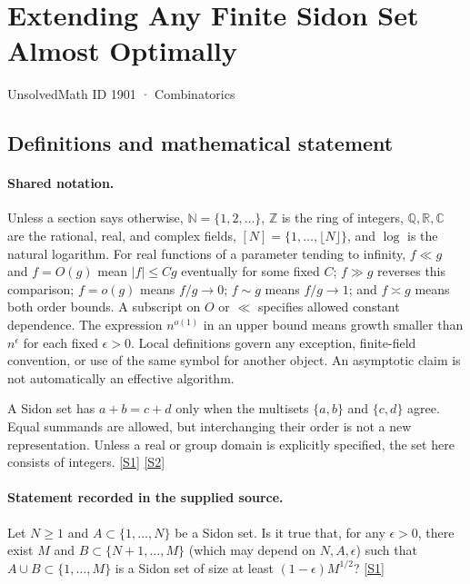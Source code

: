\documentclass[11pt,a4paper]{article}
\newcommand{\N}{\mathbb{N}}
\newcommand{\Z}{\mathbb{Z}}
\newcommand{\Q}{\mathbb{Q}}
\newcommand{\R}{\mathbb{R}}
\newcommand{\C}{\mathbb{C}}
\newcommand{\sref}[2]{\hyperlink{source:#1:#2}{[S#2]}}
\begin{document}

\setcounter{section}{1900}

\section{Extending Any Finite Sidon Set Almost Optimally}\label{1901}

{\small\sffamily UnsolvedMath ID 1901 · Combinatorics}

\subsection{Definitions and mathematical statement}

\paragraph{Shared notation.}Unless a section says otherwise, $\N=\{1,2,\ldots\}$,
$\Z$ is the ring of integers, $\Q,\R,\C$ are the rational, real, and complex
fields, $[N]=\{1,\ldots,\lfloor N\rfloor\}$, and $\log$ is the natural
logarithm. For real functions of a parameter tending to infinity,
$f\ll g$ and $f=O(g)$ mean $|f|\leq Cg$ eventually for some fixed $C$;
$f\gg g$ reverses this comparison; $f=o(g)$ means $f/g\to0$;
$f\sim g$ means $f/g\to1$; and $f\asymp g$ means both order bounds.
A subscript on $O$ or $\ll$ specifies allowed constant dependence.
The expression $n^{o(1)}$ in an upper bound means growth smaller than
$n^\epsilon$ for each fixed $\epsilon>0$. Local definitions govern any
exception, finite-field convention, or use of the same symbol for another
object. An asymptotic claim is not automatically an effective algorithm.



A Sidon set has $a+b=c+d$ only when the multisets $\{a,b\}$ and $\{c,d\}$ agree. Equal summands are allowed, but interchanging their order is not a new representation. Unless a real or group domain is explicitly specified, the set here consists of integers. \sref{1901}{1} \sref{1901}{2}

\paragraph{Statement recorded in the supplied source.}
Let $N\geq 1$ and $A\subset \{1,\ldots,N\}$ be a Sidon set. Is it true that, for any $\epsilon>0$, there exist $M$ and $B\subset \{N+1,\ldots,M\}$ (which may depend on $N,A,\epsilon$) such that $A\cup B\subset \{1,\ldots,M\}$ is a Sidon set of size at least $(1-\epsilon)M^{1/2}$? \sref{1901}{1}
\end{document}
